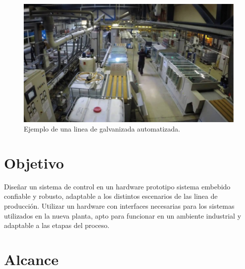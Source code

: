 \begin{figure}[h]
	\centering
	\includegraphics[width=.8\textwidth]{Figures/Cap_1/planta_moderna}
	\caption{ Ejemplo de una linea de galvanizada automatizada.}
	\label{fig:planta_moderna}
\end{figure}

\section{ Objetivo }

Diseñar un sistema de control en un hardware prototipo sistema embebido confiable y robusto, adaptable a los distintos escenarios de las linea de producción.
Utilizar un hardware con interfaces necesarias para los sistemas utilizados en la nueva planta, apto para funcionar en un ambiente industrial y adaptable a las etapas del proceso. 

\section{ Alcance }

